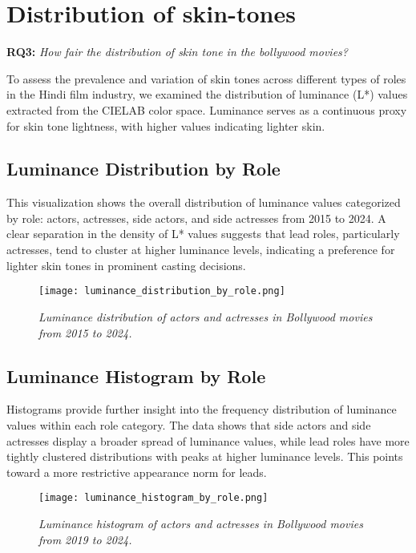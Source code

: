 \section{Distribution of skin-tones}
\label{sec:skin-tone-distribution}

\textbf{RQ3:} \textit{How fair the distribution of skin tone in the bollywood movies?}

To assess the prevalence and variation of skin tones across different types of roles in the Hindi film industry, we examined the distribution of luminance (L*) values extracted from the CIELAB color space. Luminance serves as a continuous proxy for skin tone lightness, with higher values indicating lighter skin.

\subsection{Luminance Distribution by Role}
This visualization shows the overall distribution of luminance values categorized by role: actors, actresses, side actors, and side actresses from 2015 to 2024. A clear separation in the density of L* values suggests that lead roles, particularly actresses, tend to cluster at higher luminance levels, indicating a preference for lighter skin tones in prominent casting decisions.

\begin{figure}[!htb]
    \centering
    \texttt{[image: luminance\_distribution\_by\_role.png]}
    \caption{\textit{Luminance distribution of actors and actresses in Bollywood movies from 2015 to 2024.}}
    \label{fig: Luminance Distribution by Role}
\end{figure}

\subsection{Luminance Histogram by Role}
Histograms provide further insight into the frequency distribution of luminance values within each role category. The data shows that side actors and side actresses display a broader spread of luminance values, while lead roles have more tightly clustered distributions with peaks at higher luminance levels. This points toward a more restrictive appearance norm for leads.
\begin{figure}[!htpb]
    \centering
    \texttt{[image: luminance\_histogram\_by\_role.png]}
    \caption{\textit{Luminance histogram of actors and actresses in Bollywood movies from 2019 to 2024.}}
    \label{fig: Luminance Histogram by Role}
\end{figure}

